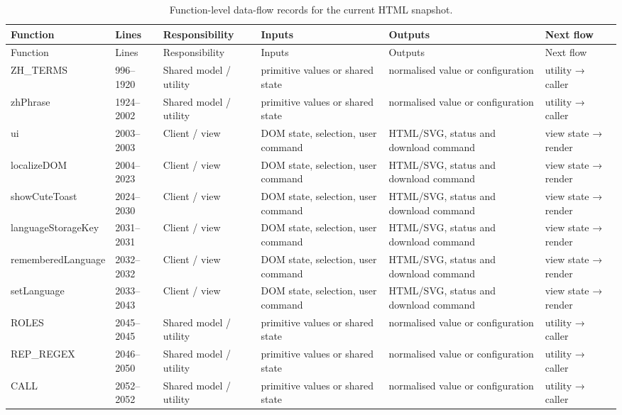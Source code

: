 \begin{landscape}\scriptsize
\begin{longtable}{@{}p{3.2cm}p{1.45cm}p{2.7cm}p{4.0cm}p{4.0cm}p{3.0cm}@{}}
\caption{Function-level data-flow records for the current HTML snapshot.}\label{tab:function-flow-map}\\
\toprule Function & Lines & Responsibility & Inputs & Outputs & Next flow\\\midrule\endfirsthead
\toprule Function & Lines & Responsibility & Inputs & Outputs & Next flow\\\midrule\endhead
ZH\_TERMS & 996--1920 & Shared model / utility & primitive values or shared state & normalised value or configuration & utility → caller \\\hline
zhPhrase & 1924--2002 & Shared model / utility & primitive values or shared state & normalised value or configuration & utility → caller \\\hline
ui & 2003--2003 & Client / view & DOM state, selection, user command & HTML/SVG, status and download command & view state → render \\\hline
localizeDOM & 2004--2023 & Client / view & DOM state, selection, user command & HTML/SVG, status and download command & view state → render \\\hline
showCuteToast & 2024--2030 & Client / view & DOM state, selection, user command & HTML/SVG, status and download command & view state → render \\\hline
languageStorageKey & 2031--2031 & Client / view & DOM state, selection, user command & HTML/SVG, status and download command & view state → render \\\hline
rememberedLanguage & 2032--2032 & Client / view & DOM state, selection, user command & HTML/SVG, status and download command & view state → render \\\hline
setLanguage & 2033--2043 & Client / view & DOM state, selection, user command & HTML/SVG, status and download command & view state → render \\\hline
ROLES & 2045--2045 & Shared model / utility & primitive values or shared state & normalised value or configuration & utility → caller \\\hline
REP\_REGEX & 2046--2050 & Shared model / utility & primitive values or shared state & normalised value or configuration & utility → caller \\\hline
CALL & 2052--2052 & Shared model / utility & primitive values or shared state & normalised value or configuration & utility → caller \\\hline

\end{longtable}
\end{landscape}
